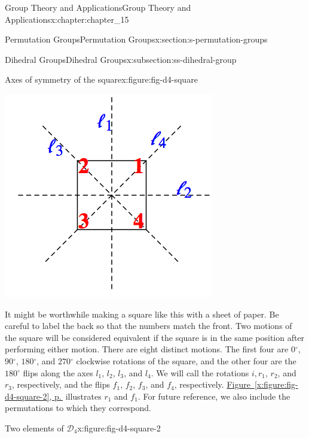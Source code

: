 \documentclass[twoside,10pt,]{book}
\newcommand{\xreffont}{\relax}
\numberwithin{equation}{section}
\begin{document}
\begin{chapterptx}{Group Theory and Applications}{}{Group Theory and Applications}{}{}{x:chapter:chapter_15}
\begin{sectionptx}{Permutation Groups}{}{Permutation Groups}{}{}{x:section:s-permutation-groups}
\begin{subsectionptx}{Dihedral Groups}{}{Dihedral Groups}{}{}{x:subsection:ss-dihedral-group}
\begin{figureptx}{Axes of symmetry of the square}{x:figure:fig-d4-square}{}
\begin{image}{0.15}{0.7}{0.15}
\includegraphics[width=\linewidth]{images/fig-d4-square.png}
\end{image}%
\tcblower
\end{figureptx}%
It might be worthwhile making a square like this with a sheet of paper. Be careful to label the back so that the numbers match the front. Two motions of the square will be considered equivalent if the square is in the same position after performing either motion. There are eight distinct motions. The first four are \(0{}^{\circ}\), \(90{}^{\circ}\), \(180{}^{\circ}\), and \(270{}^{\circ}\) clockwise rotations of the square, and the other four are the \(180{}^{\circ}\) flips along the axes \(l_1\), \(l_2\), \(l_3\), and \(l_4\). We will call the rotations \(i, r_1\), \(r_2\), and \(r_3\), respectively, and the flips \(f_1\), \(f_2\), \(f_3\), and \(f_4\), respectively. \hyperref[x:figure:fig-d4-square-2]{Figure~{\xreffont\ref{x:figure:fig-d4-square-2}}, p.\,\pageref{x:figure:fig-d4-square-2}} illustrates \(r_1\) and \(f_1\).  For future reference, we also include the permutations to which they correspond.%
\begin{figureptx}{Two elements of \(\mathcal{D}_4\)}{x:figure:fig-d4-square-2}{}%
\begin{image}{0.15}{0.7}{0.15}%

\end{image}
\end{figureptx}
\end{subsectionptx}
\end{sectionptx}
\end{chapterptx}
\end{document}
